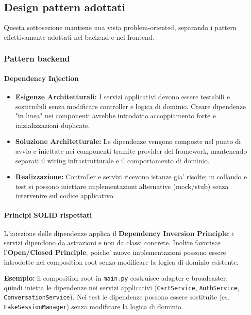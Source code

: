 \documentclass[a4paper, 11pt, oneside]{scrartcl}
\begin{document}
\subsection{Design pattern adottati}

Questa sottosezione mantiene una vista problem-oriented, separando i pattern effettivamente adottati nel backend e nel frontend.

\subsubsection{Pattern backend}

\paragraph{Dependency Injection}
\begin{itemize}
    \item \textbf{Esigenze Architetturali:} I servizi applicativi devono essere testabili e sostituibili senza modificare controller e logica di dominio. Creare dipendenze "in linea" nei componenti avrebbe introdotto accoppiamento forte e inizializzazioni duplicate.
    \item \textbf{Soluzione Architetturale:} Le dipendenze vengono composte nel punto di avvio e iniettate nei componenti tramite provider del framework, mantenendo separati il wiring infrastrutturale e il comportamento di dominio.
    \item \textbf{Realizzazione:} Controller e servizi ricevono istanze gia' risolte; in collaudo e test si possono iniettare implementazioni alternative (mock/stub) senza intervenire sul codice applicativo.
\end{itemize}

\paragraph{Principi SOLID rispettati}
L'iniezione delle dipendenze applica il \textbf{Dependency Inversion Principle}: i servizi dipendono da astrazioni e non da classi concrete. Inoltre favorisce l'\textbf{Open/Closed Principle}, poiche' nuove implementazioni possono essere introdotte nel composition root senza modificare la logica di dominio esistente.

\noindent\textbf{Esempio:} il composition root in \texttt{main.py} costruisce adapter e broadcaster, quindi inietta le dipendenze nei servizi applicativi (\texttt{CartService}, \texttt{AuthService}, \texttt{ConversationService}). Nei test le dipendenze possono essere sostituite (es. \texttt{FakeSessionManager}) senza modificare la logica di dominio.
\end{document}
